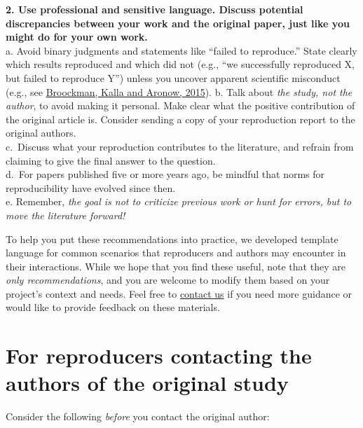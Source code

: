 \documentclass[
]{book}
\begin{document}
\textbf{2. Use professional and sensitive language. Discuss potential discrepancies between your work and the original paper, just like you might do for your own work.}\\
a. Avoid binary judgments and statements like ``failed to reproduce.'' State clearly which results reproduced and which did not (e.g., ``we successfully reproduced X, but failed to reproduce Y'') unless you uncover apparent scientific misconduct (e.g., see \href{https://doi.org/10.31222/osf.io/qy2se}{Broockman, Kalla and Aronow, 2015}).
b. Talk about \emph{the study, not the author}, to avoid making it personal. Make clear what the positive contribution of the original article is. Consider sending a copy of your reproduction report to the original authors.\\
c.~Discuss what your reproduction contributes to the literature, and refrain from claiming to give the final answer to the question.\\
d.~For papers published five or more years ago, be mindful that norms for reproducibility have evolved since then.\\
e. Remember, \emph{the goal is not to criticize previous work or hunt for errors, but to move the literature forward!}

To help you put these recommendations into practice, we developed template language for common scenarios that reproducers and authors may encounter in their interactions. While we hope that you find these useful, note that they are \emph{only recommendations}, and you are welcome to modify them based on your project's context and needs. Feel free to \href{mailto:acre@berkeley.edu}{contact us} if you need more guidance or would like to provide feedback on these materials.

\hypertarget{for-reproducers-contacting-the-authors-of-the-original-study}{%
\section{For reproducers contacting the authors of the original study}\label{for-reproducers-contacting-the-authors-of-the-original-study}}

Consider the following \emph{before} you contact the original author:
\end{document}
